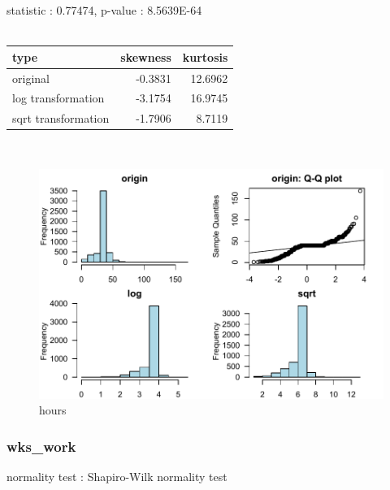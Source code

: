 \documentclass{book}\usepackage[]{graphicx}\usepackage[]{color}
\begin{document}
\noindent statistic : 0.77474,  p-value : 8.5639E-64\\
\\%
\begin{tabular}{lrr}
  \toprule
type & skewness & kurtosis \\ 
  \midrule
original & -0.3831 & 12.6962 \\ 
  log transformation & -3.1754 & 16.9745 \\ 
  sqrt transformation & -1.7906 & 8.7119 \\ 
   \bottomrule
\end{tabular}
\\
\begin{figure}[!ht]
\centering
\includegraphics[width=1.0\textwidth]{figure/norm19.pdf}
\caption{hours}
\end{figure}
\clearpage
\subsubsection{ wks\_work }

normality test : Shapiro-Wilk normality test
\end{document}
